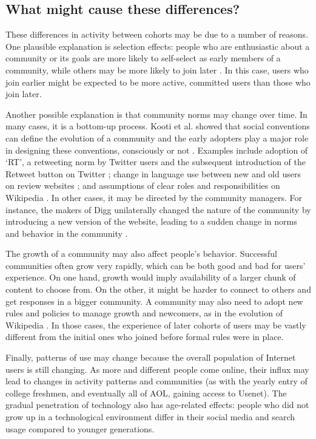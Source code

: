 \subsection{What might cause these differences?}

These differences in activity between cohorts may be due to a number of reasons.  One plausible explanation is selection effects: people who are enthusiastic about a community or its goals are more likely to self-select as early members of a community, while others may be more likely to join later \cite{Li2008}.  In this case, users who join earlier might be expected to be more active, committed users than those who join later. 

Another possible explanation is that community norms may change over time.  In many cases, it is a bottom-up process. Kooti et al. showed that social conventions can define the evolution of a community and the early adopters play a major role in designing these conventions, consciously or not \cite{Kooti2010}. Examples include adoption of `RT', a retweeting norm by Twitter users and the subsequent introduction of the Retweet button on Twitter \cite{Kooti2010}; change in language use between new and old users on review websites \cite{Danescu-niculescu-mizil2013}; and assumptions of clear roles and responsibilities on Wikipedia \cite{Kittur2007a}. In other cases, it may be directed by the community managers. For instance, the makers of Digg unilaterally changed the nature of the community by introducing a new version of the website, leading to a sudden change in norms and behavior in the community \cite{Ingram2014,Lardinois2014}. 

The growth of a community may also affect people's behavior. Successful communities often grow very rapidly, which can be both good and bad for users' experience. On one hand, growth would imply availability of a larger chunk of content to choose from. On the other, it might be harder to connect to others and get responses in a bigger community. A community may also need to adopt new rules and policies to manage growth and newcomers, as in the evolution of Wikipedia \cite{Choi2010,Bryant2005}. In those cases, the experience of later cohorts of users may be vastly different from the initial ones who joined before formal rules were in place. 

Finally, patterns of use may change because the overall population of Internet users is still changing.  As more and different people come online, their influx may lead to changes in activity patterns and communities (as with the yearly entry of college freshmen, and eventually all of AOL, gaining access to Usenet).  The gradual penetration of technology also has age-related effects:  people who did not grow up in a technological environment differ in their social media and search usage compared to younger generations\cite{Correa2010,Beldona2005}. 

